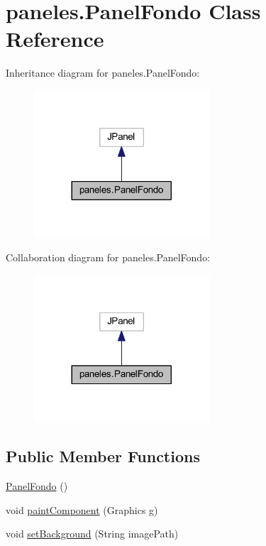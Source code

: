 \hypertarget{classpaneles_1_1_panel_fondo}{}\section{paneles.\+Panel\+Fondo Class Reference}
\label{classpaneles_1_1_panel_fondo}


Inheritance diagram for paneles.\+Panel\+Fondo\+:
\nopagebreak
\begin{figure}[H]
\begin{center}
\leavevmode
\includegraphics[width=185pt]{classpaneles_1_1_panel_fondo__inherit__graph}
\end{center}
\end{figure}


Collaboration diagram for paneles.\+Panel\+Fondo\+:
\nopagebreak
\begin{figure}[H]
\begin{center}
\leavevmode
\includegraphics[width=185pt]{classpaneles_1_1_panel_fondo__coll__graph}
\end{center}
\end{figure}
\subsection*{Public Member Functions}
\begin{DoxyCompactItemize}
\item 
\mbox{\hyperlink{classpaneles_1_1_panel_fondo_a64adb64396f808c54e8d9c5383a45531}{Panel\+Fondo}} ()
\item 
void \mbox{\hyperlink{classpaneles_1_1_panel_fondo_aeaeb3ac61110f0e637b22afc5111e9d7}{paint\+Component}} (Graphics g)
\item 
void \mbox{\hyperlink{classpaneles_1_1_panel_fondo_ae95bde361bef113903c6fa6b1b65acf2}{set\+Background}} (String image\+Path)
\end{DoxyCompactItemize}


